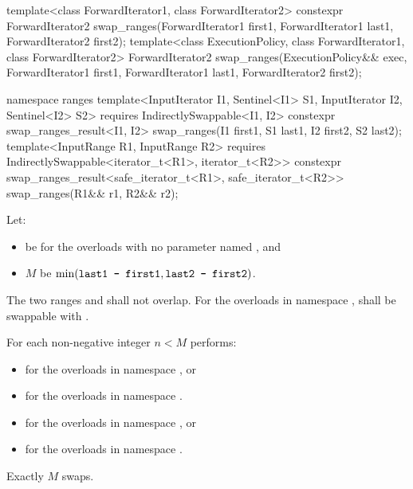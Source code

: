 %
\begin{itemdecl}
template<class ForwardIterator1, class ForwardIterator2>
  constexpr ForwardIterator2
    swap_ranges(ForwardIterator1 first1, ForwardIterator1 last1,
                ForwardIterator2 first2);
template<class ExecutionPolicy, class ForwardIterator1, class ForwardIterator2>
  ForwardIterator2
    swap_ranges(ExecutionPolicy&& exec,
                ForwardIterator1 first1, ForwardIterator1 last1,
                ForwardIterator2 first2);

namespace ranges {
  template<InputIterator I1, Sentinel<I1> S1, InputIterator I2, Sentinel<I2> S2>
    requires IndirectlySwappable<I1, I2>
    constexpr swap_ranges_result<I1, I2>
      swap_ranges(I1 first1, S1 last1, I2 first2, S2 last2);
  template<InputRange R1, InputRange R2>
    requires IndirectlySwappable<iterator_t<R1>, iterator_t<R2>>
    constexpr swap_ranges_result<safe_iterator_t<R1>, safe_iterator_t<R2>>
      swap_ranges(R1&& r1, R2&& r2);
}
\end{itemdecl}

\begin{itemdescr}
\pnum
Let:
\begin{itemize}
\item {} be  for the overloads with
  no parameter named , and
\item $M$ be $\min(\texttt{last1 - first1}, \texttt{last2 - first2})$.
\end{itemize}

\pnum
\requires
The two ranges 
and
shall not overlap.
For the overloads in namespace ,
 shall be swappable with
.

\pnum
\effects
For each non-negative integer $n < M$
performs:
\begin{itemize}
\item {} for the overloads in
  namespace , or
\item {} for the overloads
  in namespace .
\end{itemize}

\pnum
\returns
\begin{itemize}
\item {} for the overloads in namespace , or
\item {}
  for the overloads in namespace .
\end{itemize}

\pnum
\complexity
Exactly $M$ swaps.
\end{itemdescr}

